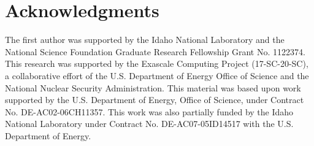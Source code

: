 \section*{A\lowercase{cknowledgments}}

The first author was supported by the Idaho National Laboratory and the National Science Foundation Graduate Research Fellowship Grant No. 1122374. This research was supported by the Exascale Computing Project (17-SC-20-SC), a collaborative effort of the U.S. Department of Energy Office of Science and the National Nuclear Security Administration. This material was based upon work supported by the U.S. Department of Energy, Office of Science, under Contract No. DE-AC02-06CH11357. This work was also partially funded by the Idaho National Laboratory under Contract No. DE-AC07-05ID14517 with the U.S. Department of Energy.
